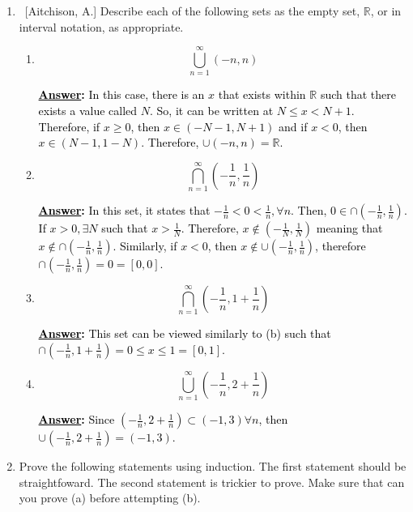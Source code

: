\documentclass[10pt]{article}
\begin{document}
\begin{enumerate}


\item ~[Aitchison, A.] Describe each of the following sets as the empty set, $\mathbb{R}$, or in interval notation, as appropriate.

	\begin{enumerate}
	
	\item  $$\bigcup_{n=1}^{\infty} \left( -n, n \right)$$
\par \medskip
	\textbf{\textcolor{black}{\underline{Answer}:}}
\textcolor{black}{In this case, there is an $x$ that exists within $\mathbb{R}$ such that there exists a value called $N$.  So, it can be written at $N \leq x < N+1$.  Therefore, if $x \geq 0$, then $x \in (-N-1, N+1)$ and if $x < 0$, then $x \in (N-1, 1-N)$.  Therefore, $\cup(-n,n) = \mathbb{R}$.}
	
	\item  $$\bigcap_{n=1}^{\infty} \left( -\frac{1}{n}, \frac{1}{n} \right)$$
	\par \medskip
	\textbf{\textcolor{black}{\underline{Answer}:}}
\textcolor{black}{In this set, it states that $-\frac{1}{n} < 0 < \frac{1}{n}, \forall n$.  Then, $0 \in \cap(-\frac{1}{n}, \frac{1}{n})$.  If $x > 0, \exists N$ such that $x > \frac{1}{N}$.  Therefore, $x \notin (-\frac{1}{N}, \frac{1}{N})$ meaning that $x \notin \cap(-\frac{1}{n},\frac{1}{n})$.  Similarly, if $x < 0$, then $x \notin \cup(-\frac{1}{n},\frac{1}{n})$, therefore $\cap(-\frac{1}{n},\frac{1}{n})={0}=[0,0]$.}

	\item  $$\bigcap_{n=1}^{\infty} \left( -\frac{1}{n}, 1 + \frac{1}{n} \right)$$
	\par \medskip
	\textbf{\textcolor{black}{\underline{Answer}:}}
\textcolor{black}{This set can be viewed similarly to (b) such that $\cap(-\frac{1}{n},1+\frac{1}{n}) = {0 \leq x \leq 1} = [0,1]$.}
	\item  $$\bigcup_{n=1}^{\infty} \left( -\frac{1}{n}, 2 + \frac{1}{n} \right)$$
	\par \medskip
	\textbf{\textcolor{black}{\underline{Answer}:}}
\textcolor{black}{Since $(-\frac{1}{n}, 2 + \frac{1}{n}) \subset (-1,3) \forall n$, then $\cup(-\frac{1}{n}, 2 + \frac{1}{n}) = (-1,3)$.}
	\end{enumerate}
	
\item  Prove the following statements using induction.  The first statement should be straightfoward.  The second statement is trickier to prove.  Make sure that can you prove (a) before attempting (b).


\end{enumerate}
\end{document}
